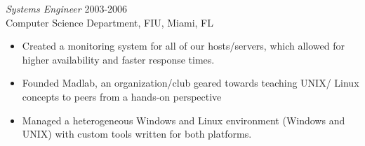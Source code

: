 \documentclass[margin]{res}
\begin{document}
\begin{resume}
  {\sl Systems Engineer} \hfill            2003-2006 \\
  Computer Science Department, FIU, Miami, FL
  \begin{itemize}  \itemsep -2pt %
    \item Created a monitoring system for all of our hosts/servers, which allowed
      for higher availability and faster response times.
    \item Founded Madlab, an organization/club geared towards teaching UNIX/
      Linux concepts to peers from a hands-on perspective
    \item Managed a heterogeneous Windows and Linux environment (Windows and UNIX) with
      custom tools written for both platforms.
  \end{itemize} 

\end{resume}
\end{document}
